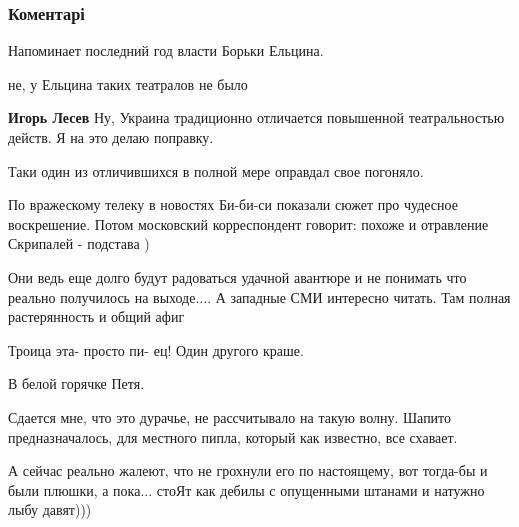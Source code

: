  
 
 
 
 
\subsubsection{Коментарі}
\label{sec:31_05_2018.fb.lesev_igor.1.babchenko_2.cmt}

\begin{itemize} %
Напоминает последний год власти Борьки Ельцина.

\begin{itemize} %
не, у Ельцина таких театралов не было

\textbf{Игорь Лесев} Ну, Украина традиционно отличается повышенной театральностью действ. Я на это делаю поправку.
\end{itemize} %

Таки один из отличившихся в полной мере оправдал свое погоняло.


По вражескому телеку в новостях Би-би-си показали сюжет про чудесное
воскрешение. Потом московский корреспондент говорит: похоже и отравление
Скрипалей - подстава )


Они ведь еще долго будут радоваться удачной авантюре и не понимать что реально
получилось на выходе.... А западные СМИ интересно читать. Там полная
растерянность и общий афиг

Троица эта- просто пи- ец! Один другого краше.

В белой горячке Петя.


Сдается мне, что это дурачье, не рассчитывало на такую волну. Шапито
предназначалось, для местного пипла, который как известно, все схавает.

А сейчас реально жалеют, что не грохнули его по настоящему, вот тогда-бы и были
плюшки, а пока... стоЯт как дебилы с опущенными штанами и натужно лыбу давят)))

\end{itemize} %
